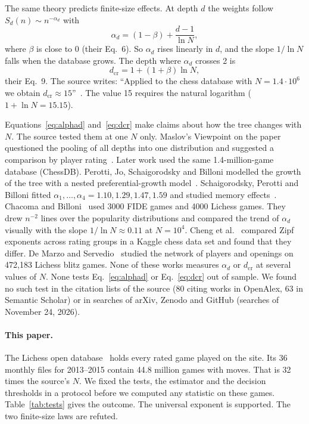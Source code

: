\documentclass[11pt]{article}
\begin{document}
The same theory predicts finite-size effects. At depth $d$ the weights follow $S_d(n)\sim n^{-\alpha_d}$ with
\begin{equation}
\alpha_d=(1-\beta)+\frac{d-1}{\ln N}, \label{eq:alphad}
\end{equation}
where $\beta$ is close to 0 (their Eq.~6). So $\alpha_d$ rises linearly in $d$, and the slope $1/\ln N$ falls when the database grows. The depth where $\alpha_d$ crosses 2 is
\begin{equation}
d_{\mathrm{cr}}=1+(1+\beta)\ln N, \label{eq:dcr}
\end{equation}
their Eq.~9. The source writes: ``Applied to the chess database with $N=1.4\cdot10^6$ we obtain $d_{\mathrm{cr}}\approx15$''~\cite{bt}. The value 15 requires the natural logarithm ($1+\ln N=15.15$).

Equations~\eqref{eq:alphad} and~\eqref{eq:dcr} make claims about how the tree changes with $N$. The source tested them at one $N$ only. Maslov's Viewpoint on the paper questioned the pooling of all depths into one distribution and suggested a comparison by player rating~\cite{maslov}. Later work used the same 1.4-million-game database (ChessDB). Perotti, Jo, Schaigorodsky and Billoni modelled the growth of the tree with a nested preferential-growth model~\cite{perotti}. Schaigorodsky, Perotti and Billoni fitted $\alpha_1,\dots,\alpha_4=1.10, 1.29, 1.47, 1.59$ and studied memory effects~\cite{schaig}. Chacoma and Billoni~\cite{chacoma} used 3000 FIDE games and 4000 Lichess games. They drew $n^{-2}$ lines over the popularity distributions and compared the trend of $\alpha_d$ visually with the slope $1/\ln N\approx0.11$ at $N=10^4$. Cheng et al.~\cite{cheng} compared Zipf exponents across rating groups in a Kaggle chess data set and found that they differ. De Marzo and Servedio~\cite{demarzo} studied the network of players and openings on 472,183 Lichess blitz games. None of these works measures $\alpha_d$ or $d_{\mathrm{cr}}$ at several values of $N$. None tests Eq.~\eqref{eq:alphad} or Eq.~\eqref{eq:dcr} out of sample. We found no such test in the citation lists of the source (80 citing works in OpenAlex, 63 in Semantic Scholar) or in searches of arXiv, Zenodo and GitHub (searches of November 24, 2026).

\paragraph{This paper.} The Lichess open database~\cite{lichess} holds every rated game played on the site. Its 36 monthly files for 2013--2015 contain 44.8 million games with moves. That is 32 times the source's $N$. We fixed the tests, the estimator and the decision thresholds in a protocol before we computed any statistic on these games. Table~\ref{tab:tests} gives the outcome. The universal exponent is supported. The two finite-size laws are refuted.
\end{document}
